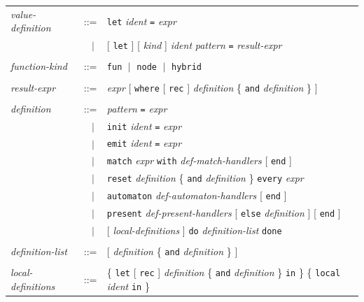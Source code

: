 \documentclass[11pt,titlepage,twoside]{report}
\newcommand{\alt}{\;|\;}
\newcommand{\Let}{\mbox{{\tt let}}}
\newcommand{\Rec}{\mbox{{\tt rec}}}
\newcommand{\In}{\mbox{{\tt in}}}
\newcommand{\And}{\mbox{{\tt and}}}
\renewcommand{\Reset}{\mbox{{\tt reset}}}
\newcommand{\Every}{\mbox{{\tt every}}}
\newcommand{\Where}{\mbox{{\tt where}}}
\newcommand{\term}[1]{{\tt #1}}
\newcommand{\nterm}[1]{{\em #1}}
\begin{document}
\label{definitions}
\begin{center}
\begin{tabular}{lcl}
\nterm{value-definition}
   & ::=        & \term{let} \nterm{ident} \term{=} \nterm{expr} \\
   & $\;\;\alt$ & [ \term{let} ] [ \nterm{kind} ] \nterm{ident} \nterm{pattern} \term{=}
                    \nterm{result-expr}
\\ \\
\nterm{function-kind} & ::=  & \term{fun} $\alt$ \term{node}
                                              $\alt$ \term{hybrid}
\\ \\
\nterm{result-expr}
& ::=    & \nterm{expr} [ \term{\Where} [ \term{\Rec} ]
  \nterm{definition} \{ \term{\And} \nterm{definition} \} ]
\\ \\
\nterm{definition} 
& ::=        & \nterm{pattern} \term{=} \nterm{expr} \\
   & $\;\;\alt$ & \term{init} \nterm{ident} \term{=} \nterm{expr} \\
   & $\;\;\alt$ & \term{emit} \nterm{ident} \term{=} \nterm{expr} \\
& $\;\;\alt$ & \term{match} \nterm{expr} \term{with}  
\nterm{def-match-handlers} [ \term{end} ]
\\
& $\;\;\alt$ & \term{\Reset} \nterm{definition}
               \{ \term{\And} \nterm{definition} \} \term{\Every} \nterm{expr}
                  \\
& $\;\;\alt$ & \term{automaton} \nterm{def-automaton-handlers}
                  [ \term{end} ]
                  \\
& $\;\;\alt$ & \term{present} \nterm{def-present-handlers}
                    [ \term{else} \nterm{definition} ] [ \term{end} ]
                  \\
& $\;\;\alt$ & [ \nterm{local-definitions} ]
                    \term{do} \nterm{definition-list} \term{done}
\\ \\
\nterm{definition-list}
   & ::=        & [ \nterm{definition} \{ \term{\And}
                  \nterm{definition} \} ]
\\ \\
\nterm{local-definitions}      
   & ::=        & \{ \term{\Let} [ \term{\Rec} ] \nterm{definition}
                  \{ \term{\And} \nterm{definition} \} \term{\In} \}
                  \{ \term{local} \nterm{ident} \term{in} \}
\end{tabular}
\end{center}
\end{document}
